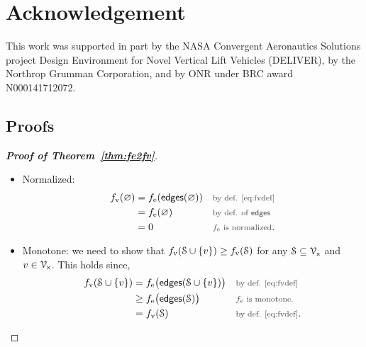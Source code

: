 \documentclass[conference]{IEEEtran}
\begin{document}
\section*{Acknowledgement}
This work was supported in part by the NASA Convergent Aeronautics Solutions
project Design Environment for Novel Vertical Lift Vehicles (DELIVER), by the
Northrop Grumman Corporation, and by ONR under BRC award
N000141712072.


\clearpage



\clearpage
\pagebreak
\appendix



\subsection{Proofs}
\begin{proof}[\bfseries Proof of Theorem~\ref{thm:fe2fv}]

\begin{itemize}
\item Normalized:
\begin{align}
\fv(\varnothing) & = \fe(\edg(\varnothing)) &&\ptext{by def.
\eqref{eq:fvdef}}\\&=
\fe(\varnothing) && \ptext{by def. of $\edg$} \\&= 0 && \ptext{$\fe$ is normalized}.
\label{}
\end{align}

\item Monotone:
we need to show that $f_\text{v}(\mathcal{S} \cup\{v\})
 \geq
f_\text{v}(\mathcal{S})$ for any $\mathcal{S} \subseteq \mathcal{V}_\mathsf{x}$ and $v \in \mathcal{V}_\mathsf{x}$. This holds since,
\begin{align}
\fv(\Scal \cup \{v\}) & = \fe\big(\edg(\Scal \cup \{v\})\big) &&
\ptext{by def. \eqref{eq:fvdef}}\\
& \geq \fe\big(\edg(\Scal)\big) && \ptext{$\fe$ is monotone.}\\
& = \fv(\Scal) && \ptext{by def. \eqref{eq:fvdef}}.
\label{}
\end{align}


\end{itemize}
\end{proof}
\end{document}
